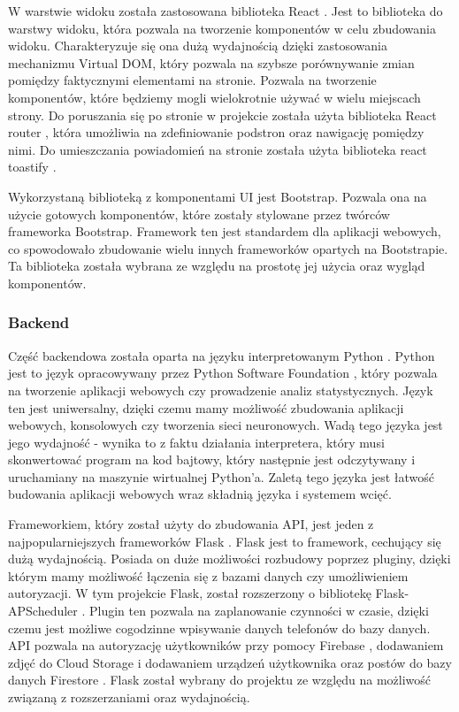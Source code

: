W warstwie widoku została zastosowana biblioteka React \cite{React}. Jest to biblioteka do warstwy widoku, która pozwala na tworzenie komponentów w celu zbudowania widoku. Charakteryzuje się ona dużą wydajnością dzięki zastosowania mechanizmu Virtual DOM, który pozwala na szybsze porównywanie zmian pomiędzy faktycznymi elementami na stronie. Pozwala na tworzenie komponentów, które będziemy mogli wielokrotnie używać w wielu miejscach strony. Do poruszania się po stronie w projekcie została użyta biblioteka React router \cite{react_router}, która umożliwia na zdefiniowanie podstron oraz nawigację pomiędzy nimi. Do umieszczania powiadomień na stronie została użyta biblioteka react toastify \cite{react_toastify}.

Wykorzystaną biblioteką z komponentami UI jest Bootstrap. Pozwala ona na użycie gotowych komponentów, które zostały stylowane przez twórców frameworka Bootstrap. Framework ten jest standardem dla aplikacji webowych, co spowodowało zbudowanie wielu innych frameworków opartych na Bootstrapie. Ta biblioteka została wybrana ze względu na prostotę jej użycia oraz wygląd komponentów. 

\subsubsection{Backend}
Część backendowa została oparta na języku interpretowanym Python \cite{python}. Python jest to język opracowywany przez Python Software Foundation \cite{psf}, który pozwala na tworzenie aplikacji webowych czy prowadzenie analiz statystycznych. Język ten jest uniwersalny, dzięki czemu mamy możliwość zbudowania aplikacji webowych, konsolowych czy tworzenia sieci neuronowych. Wadą tego języka jest jego wydajność - wynika to z faktu działania interpretera, który musi skonwertować program na kod bajtowy, który następnie jest odczytywany i uruchamiany na maszynie wirtualnej Python'a. Zaletą tego języka jest łatwość budowania aplikacji webowych wraz składnią języka i systemem wcięć.

Frameworkiem, który został użyty do zbudowania API, jest jeden z najpopularniejszych frameworków Flask \cite{flask}. Flask jest to framework, cechujący się dużą wydajnością. Posiada on duże możliwości rozbudowy poprzez pluginy, dzięki którym mamy możliwość łączenia się z bazami danych czy umożliwieniem autoryzacji. W tym projekcie Flask, został rozszerzony o bibliotekę Flask-APScheduler \cite{flask_apscheduler}. Plugin ten pozwala na zaplanowanie czynności w czasie, dzięki czemu jest możliwe cogodzinne wpisywanie danych telefonów do bazy danych. API pozwala na autoryzację użytkowników przy pomocy Firebase \cite{firebase}, dodawaniem zdjęć do Cloud Storage \cite{cloud_storage} i dodawaniem urządzeń użytkownika oraz postów do bazy danych Firestore \cite{firestore}. Flask został wybrany do projektu ze względu na możliwość związaną z rozszerzaniami oraz wydajnością.

